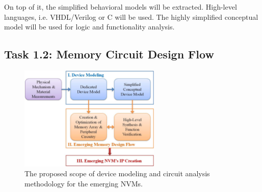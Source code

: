 On top of it, the simplified behavioral models will be extracted. High-level languages, i.e. VHDL/Verilog or C will be used. The highly simplified conceptual model will be used for logic and functionality analysis.

\subsection{Task 1.2: Memory Circuit Design Flow}

\begin{figure}\centering \centering   \includegraphics[width=0.6\textwidth]{./figure/HL-flow.pdf}
\caption{The proposed scope of device modeling and circuit analysis methodology for the emerging NVMs.}\label{flow}  \vspace{-20pt}
\end{figure}

